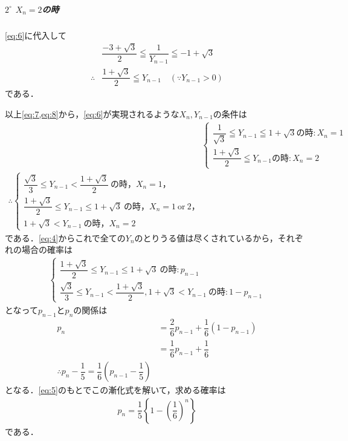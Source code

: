 \documentclass[../../main.tex]{subfiles}
\begin{document}
\subparagraph{$2^{\circ}$ $X_n=2$の時}

\cref{eq:6}に代入して
\begin{align}
  & \dfrac{-3+\sqrt{3}}{2} \leqq \dfrac{1}{Y_{n-1}} \leqq -1 + \sqrt{3} \\
  \therefore
  & \dfrac{1+\sqrt{3}}{2} \leqq Y_{n-1} \quad (\because Y_{n-1}>0) \label{eq:8}
\end{align}
である．
\casesend

以上\cref{eq:7,eq:8}から，\cref{eq:6}が実現されるような$X_n,Y_{n-1}$の条件は
\begin{align}
  &
  \begin{cases}
    \dfrac{1}{\sqrt{3}} \leqq Y_{n-1} \leqq 1 + \sqrt{3} \text{の時}: X_n = 1 \\
    \dfrac{1+\sqrt{3}}{2} \leqq Y_{n-1} \text{の時}: X_n = 2
  \end{cases} \\
  \therefore
  \begin{cases}
    \dfrac{\sqrt{3}}{3}\le Y_{n-1}<\dfrac{1+\sqrt{3}}{2}\ \text{の時，}X_{n}=1，\\
    \dfrac{1+\sqrt{3}}{2}\le Y_{n-1}\le1+\sqrt{3}\ \text{の時，}X_{n}=1\ \text{or}\ 2，\\
    1+\sqrt{3}<Y_{n-1}\ \text{の時，}X_{n}=2
  \end{cases}
\end{align}
である．\cref{eq:4}からこれで全ての$Y_n$のとりうる値は尽くされているから，それぞれの場合の確率は
\begin{align}
  \begin{cases}
    \dfrac{1+\sqrt{3}}{2}\le Y_{n-1}\le1+\sqrt{3} \ \text{の時}: p_{n-1} \\
    \dfrac{\sqrt{3}}{3}\le Y_{n-1}<\dfrac{1+\sqrt{3}}{2}, 1+\sqrt{3}<Y_{n-1} \ \text{の時}: 1-p_{n-1}
  \end{cases}
\end{align}
となって$p_{n-1}$と$p_n$の関係は
\begin{align}
  p_{n}
  &=\dfrac{2}{6}p_{n-1}+\dfrac{1}{6}(1-p_{n-1})\\
  &=\dfrac{1}{6}p_{n-1}+\dfrac{1}{6} \\
  \therefore
  p_{n}-\dfrac{1}{5} = \dfrac{1}{6}\left(p_{n-1}-\dfrac{1}{5}\right)
\end{align}
となる．\cref{eq:5}のもとでこの漸化式を解いて，求める確率は
\begin{align}
  p_n=\dfrac{1}{5}\left\{1-\left(\dfrac{1}{6}\right)^n\right\}
\end{align}
である．

\newpage
\end{document}
